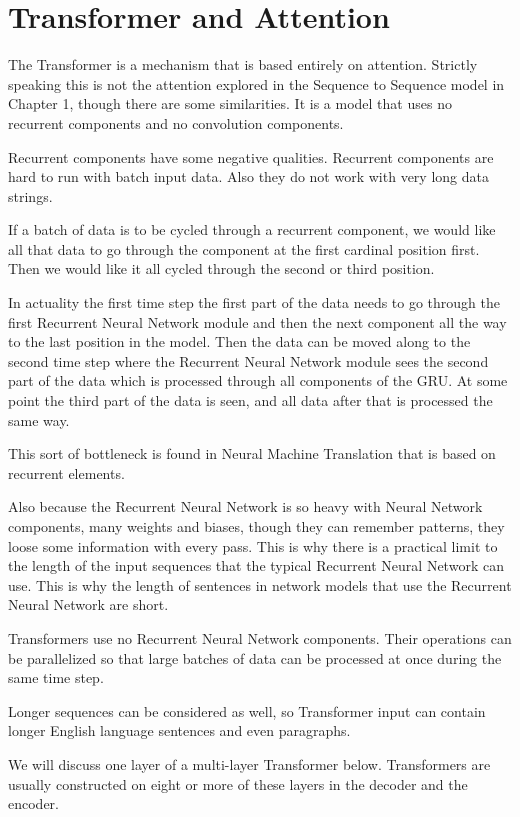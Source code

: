 
\section{Transformer and Attention}

The Transformer is a mechanism that is based entirely on attention. Strictly speaking this is not the attention explored in the Sequence to Sequence model in Chapter 1, though there are some similarities. It is a model that uses no recurrent components and no convolution components. 

Recurrent components have some negative qualities. Recurrent components are hard to run with batch input data. Also they do not work with very long data strings. 

If a batch of data is to be cycled through a recurrent component, we would like all that data to go through the component at the first cardinal position first. Then we would like it all cycled through the second or third position. 

In actuality the first time step the first part of the data needs to go through the first Recurrent Neural Network module and then the next component all the way to the last position in the model. Then the data can be moved along to the second time step where the Recurrent Neural Network module sees the second part of the data which is processed through all components of the GRU. At some point the third part of the data is seen, and all data after that is processed the same way.

This sort of bottleneck is found in Neural Machine Translation that is based on recurrent elements.

Also because the Recurrent Neural Network is so heavy with Neural Network components, many weights and biases, though they can remember patterns, they loose some information with every pass. This is why there is a practical limit to the length of the input sequences that the typical Recurrent Neural Network can use. This is why the length of sentences in network models that use the Recurrent Neural Network are short.

Transformers use no Recurrent Neural Network components. Their operations can be parallelized so that large batches of data can be processed at once during the same time step. 

Longer sequences can be considered as well, so Transformer input can contain longer English language sentences and even paragraphs. 

We will discuss one layer of a multi-layer Transformer below. Transformers are usually constructed on eight or more of these layers in the decoder and the encoder.

